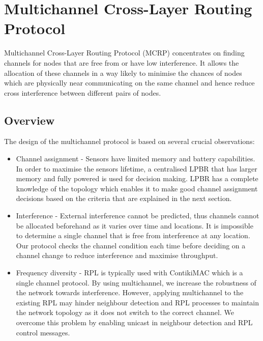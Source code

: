 \section{Multichannel Cross-Layer Routing Protocol}
\label{sec:multichannel}

Multichannel Cross-Layer Routing Protocol (MCRP) concentrates on finding channels for nodes that are
free from or have low interference. It allows the allocation of these channels in a way likely
to minimise the chances of nodes which are physically near communicating on the same channel and
hence reduce cross interference between different pairs of nodes.

\subsection{Overview}


The design of the multichannel protocol is based on several crucial observations:
\begin{itemize}
\item Channel assignment - Sensors have limited memory and battery capabilities. In order to maximise the sensors lifetime, a centralised LPBR that has larger memory and fully powered is used for decision making. LPBR has a complete knowledge of the topology which enables it to make good channel assignment decisions based on the criteria that are explained in the next section. 
\item Interference - External interference cannot be predicted, thus channels cannot be allocated beforehand as it varies over time and locations. It is impossible to determine a single channel that is free from interference at any location. Our protocol checks the channel condition each time before deciding on a channel change to reduce interference and maximise throughput.
\item Frequency diversity - RPL is typically used with ContikiMAC which is a single channel protocol. By using multichannel, we increase the robustness of the network towards interference. However, applying multichannel to the existing RPL may hinder neighbour detection and RPL processes to maintain the network topology as it does not switch to the correct channel. We overcome this problem by enabling unicast in neighbour detection and RPL control messages. %
\end{itemize}

